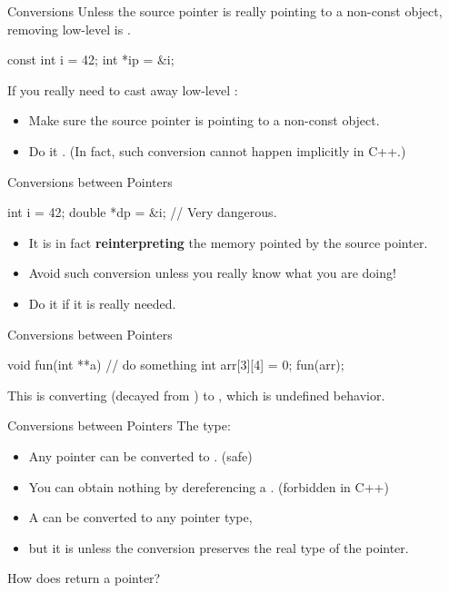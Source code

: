 \documentclass[handout]{beamer}
\begin{document}
\begin{frame}[fragile]{ Conversions}
    Unless the source pointer is really pointing to a non-const object, removing low-level  is .
    \begin{cpp}
const int i = 42;
int *ip = &i;
    \end{cpp}
    \pause
    If you really need to cast away low-level :
    \begin{itemize}
        \item Make sure the source pointer is pointing to a non-const object.
        \item Do it . (In fact, such conversion cannot happen implicitly in C++.)
    \end{itemize}
\end{frame}

\begin{frame}[fragile]{Conversions between Pointers}
    \begin{cpp}
int i = 42;
double *dp = &i; // Very dangerous.
    \end{cpp}
    \begin{itemize}
        \item It is in fact \textbf{reinterpreting} the memory pointed by the source pointer.
        \item Avoid such conversion unless you really know what you are doing!
        \item Do it  if it is really needed.
    \end{itemize}
\end{frame}

\begin{frame}[fragile]{Conversions between Pointers}
    \begin{cpp}
void fun(int **a) {
  // do something
}
int arr[3][4] = {0};
fun(arr);
    \end{cpp}
    This is converting \ttt{(*)[4]} (decayed from \ttt{[3][4]}) to \ttt{**}, which is undefined behavior.
\end{frame}

\begin{frame}{Conversions between Pointers}
    The \ttt{*} type:
    \begin{itemize}
        \item Any pointer can be converted to \ttt{*}. (safe)
        \item You can obtain nothing by dereferencing a \ttt{*}. (forbidden in C++)
        \pause
        \item A \ttt{*} can be converted to any pointer type,
        \item but it is  unless the conversion preserves the real type of the pointer.
    \end{itemize}
    \pause
    \begin{question}
        How does  return a pointer?
    \end{question}
\end{frame}
\end{document}

